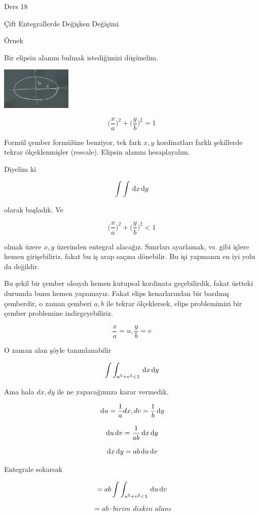 \documentclass[12pt,fleqn]{article}\usepackage{../../common}
\begin{document}
Ders 18

Çift Entegrallerde Değişken Değişimi 

Örnek 

Bir elipsin alanını bulmak istediğimizi düşünelim. 

\begin{center}
\includegraphics[height=2cm]{18_1.png}
\end{center}

$$ \bigg(\frac{x}{a}\bigg)^2 + \bigg(\frac{y}{b}\bigg)^2 = 1 $$

Formül çember formülüne benziyor, tek fark $x,y$ kordinatları farklı
şekillerde tekrar ölçeklenmişler (rescale). Elipsin alanını hesaplayalım. 

Diyelim ki 

$$ \int \int \,\mathrm{d} x \,\mathrm{d} y $$

olarak başladık. Ve

$$ \bigg(\frac{x}{a}\bigg)^2 + \bigg(\frac{y}{b}\bigg)^2 < 1 $$

olmak üzere $x,y$ üzerinden entegral alacağız. Sınırları ayarlamak, vs. gibi
işlere hemen girişebiliriz, fakat bu iş arap saçına dönebilir. Bu işi yapmanın
en iyi yolu da değildir.

Bu şekil bir çember olsaydı hemen kutupsal kordinata geçebilirdik, fakat üstteki
durumda bunu hemen yapamayız. Fakat elips kenarlarından bir basılmış çemberdir,
o zaman çemberi $a,b$ ile tekrar ölçeklersek, elips problemimizi bir çember
problemine indirgeyebiliriz.

$$ \frac{x}{a} = u, \frac{y}{b} = v $$

O zaman alan şöyle tanımlanabilir 

$$ \int \int_{u^2 + v^2 < 1} \,\mathrm{d} x \,\mathrm{d} y $$

Ama hala $dx,dy$ ile ne yapacağımıza karar vermedik. 

$$ \,\mathrm{d} u = \frac{1}{a}dx,dv = \frac{1}{b} \,\mathrm{d} y $$

$$ \,\mathrm{d} u \,\mathrm{d} v = \frac{1}{ab} \,\mathrm{d} x \,\mathrm{d} y $$

$$ \,\mathrm{d} x \,\mathrm{d} y = ab \,\mathrm{d} u \,\mathrm{d} v $$

Entegrale sokarsak

$$ = ab \int \int_{u^2 + v^2 < 1} \,\mathrm{d} u \,\mathrm{d} v $$

$$ = ab \cdot \textit{birim diskin alanı} $$
\end{document}
